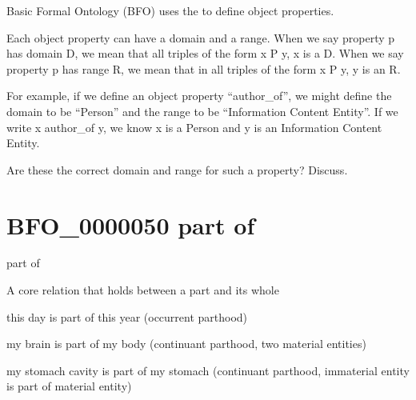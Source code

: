 \documentclass[letterpaper,10pt,english]{sphinxmanual}
\begin{document}
\sphinxAtStartPar
Basic Formal Ontology (BFO) uses the
 to define object
properties.

\sphinxAtStartPar
Each object property can have a domain and a range.  When we say property p has domain D,
we mean that all triples of the form x P y, x is a D.  When we say property p has range R,
we mean that in all triples of the form x P y, y is an R.

\sphinxAtStartPar
For example, if we define an object property “author\_of”, we might define the domain to
be “Person” and the range to be “Information Content Entity”. If we write x author\_of y,
we know x is a Person and y is an Information Content Entity. %
\begin{footnote}[1]\sphinxAtStartFootnote
Are these the correct domain and range for such a property? Discuss.
%
\end{footnote}
\begin{quote}
\label{\detokenize{doc-BFO_0000050:bfo-0000050}}\label{\detokenize{doc-BFO_0000050:part-of}}\label{\detokenize{doc-BFO_0000050:bfo-0000050}}
\ignorespaces \end{quote}


\section{BFO\_0000050 \sphinxhyphen{} part of}
\label{\detokenize{doc-BFO_0000050:bfo-0000050-part-of}}\label{\detokenize{doc-BFO_0000050:index-0}}\label{\detokenize{doc-BFO_0000050::doc}}
\begin{sphinxShadowBox}

\sphinxAtStartPar
part of
\end{sphinxShadowBox}

\begin{sphinxShadowBox}

\sphinxAtStartPar
A core relation that holds between a part and its whole
\end{sphinxShadowBox}

\begin{sphinxShadowBox}

\sphinxAtStartPar
this day is part of this year (occurrent parthood)

\sphinxAtStartPar
my brain is part of my body (continuant parthood, two material entities)

\sphinxAtStartPar
my stomach cavity is part of my stomach (continuant parthood, immaterial entity is part of material entity)
\end{sphinxShadowBox}
\end{document}
